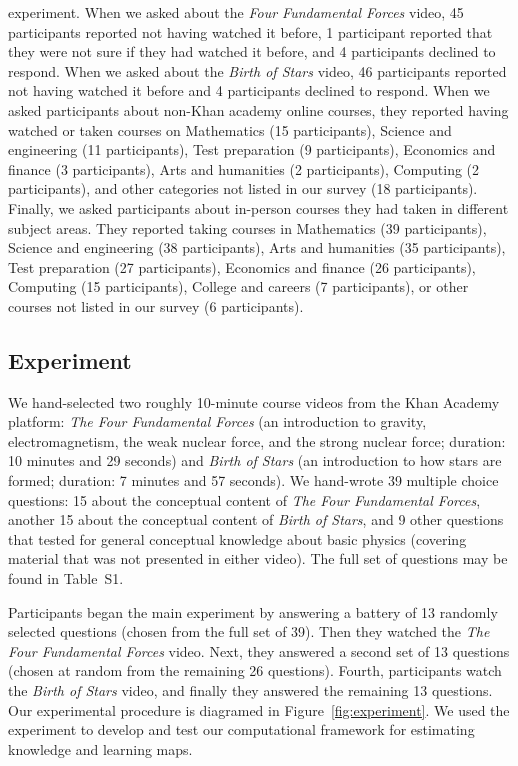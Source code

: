 \documentclass[10pt]{article}
\newcommand{\questions}{S1}
\begin{document}
experiment.  When we asked about the \textit{Four Fundamental Forces}
video, 45 participants reported not having watched it before, 1
participant reported that they were not sure if they had watched it
before, and 4 participants declined to respond.  When we asked about
the \textit{Birth of Stars} video, 46 participants reported not having
watched it before and 4 participants declined to respond.  When we
asked participants about non-Khan academy online courses, they
reported having watched or taken courses on Mathematics (15
participants), Science and engineering (11 participants), Test
preparation (9 participants), Economics and finance (3 participants),
Arts and humanities (2 participants), Computing (2 participants), and
other categories not listed in our survey (18 participants).  Finally,
we asked participants about in-person courses they had taken in
different subject areas.  They reported taking courses in Mathematics
(39 participants), Science and engineering (38 participants), Arts and
humanities (35 participants), Test preparation (27 participants),
Economics and finance (26 participants), Computing (15 participants),
College and careers (7 participants), or other courses not listed in
our survey (6 participants).


\subsection*{Experiment}

We hand-selected two roughly 10-minute course videos from the Khan Academy
platform: \textit{The Four Fundamental Forces} (an introduction to gravity,
electromagnetism, the weak nuclear force, and the strong nuclear force;
duration: 10 minutes and 29 seconds) and \textit{Birth of Stars} (an
introduction to how stars are formed; duration: 7 minutes and 57 seconds). We
hand-wrote 39 multiple choice questions: 15 about the conceptual content of
\textit{The Four Fundamental Forces}, another 15 about the conceptual content
of \textit{Birth of Stars}, and 9 other questions that tested for general
conceptual knowledge about basic physics (covering material that was not
presented in either video). The full set of questions may be found in
Table~\questions.



Participants began the main experiment by answering a battery of 13 randomly
selected questions (chosen from the full set of 39). Then they watched the
\textit{The Four Fundamental Forces} video. Next, they answered a second set of
13 questions (chosen at random from the remaining 26 questions). Fourth,
participants watch the \textit{Birth of Stars} video, and finally they answered
the remaining 13 questions. Our experimental procedure is diagramed in
Figure~\ref{fig:experiment}. We used the experiment to develop and test our
computational framework for estimating knowledge and learning maps.
\end{document}
